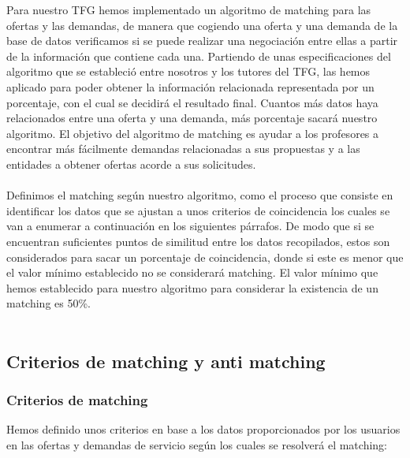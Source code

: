 \documentclass[11pt]{article}
\begin{document}
Para nuestro TFG hemos implementado un algoritmo de matching para las ofertas y las demandas, de manera que cogiendo una oferta y una demanda de la base de datos verificamos si se puede realizar una negociación entre ellas a partir de la información que contiene cada una. Partiendo de unas especificaciones del algoritmo que se estableció entre nosotros y los tutores del TFG, las hemos aplicado para poder obtener la información relacionada representada por un porcentaje, con el cual  se decidirá el resultado final.  Cuantos más datos haya relacionados entre una oferta y una demanda, más porcentaje sacará nuestro algoritmo. El objetivo del algoritmo de matching es ayudar a los profesores a encontrar más fácilmente demandas relacionadas a sus propuestas y a las entidades a obtener ofertas acorde a sus solicitudes. \\\\

Definimos el matching según nuestro algoritmo, como el proceso que consiste en identificar los datos que se ajustan a unos criterios de coincidencia los cuales se van a enumerar a continuación en los siguientes párrafos. De modo que si se encuentran suficientes puntos de similitud entre los datos recopilados, estos son considerados para sacar un porcentaje de coincidencia, donde si este es menor que el valor mínimo establecido no se considerará matching. El valor mínimo que hemos establecido para nuestro algoritmo para considerar la existencia de un matching es 50\%.
\\\\

\subsection{Criterios de matching y anti matching}
\subsubsection{Criterios de matching }

Hemos definido unos criterios en base a los datos proporcionados por los usuarios en las ofertas y demandas de servicio según los cuales se resolverá el matching:
\end{document}
